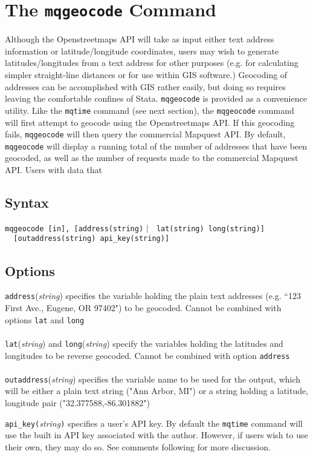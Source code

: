 \documentclass[12pt]{article}
\begin{document}
\section{The \texttt{mqgeocode} Command}
Although the Openstreetmaps API will take as input either text address information or latitude/longitude coordinates, users may wish to generate latitudes/longitudes from a text address for other purposes (e.g. for calculating simpler straight-line distances or for use within GIS software.) Geocoding of addresses can be accomplished with GIS rather easily, but doing so requires leaving the comfortable confines of Stata. \verb|mqgeocode| is provided as a convenience utility. Like the \verb|mqtime| command (see next section), the \verb|mqgeocode| command will first attempt to geocode using the Openstreetmaps API. If this geocoding fails, \verb|mqgeocode| will then query the commercial Mapquest API. By default,  \verb|mqgeocode| will display a running total of the number of addresses that have been geocoded, as well as the number of requests made to the commercial Mapquest API. Users with data that 

\subsection{Syntax}
\verb|mqgeocode [in], [address(string)| $\arrowvert$ \verb| lat(string) long(string)]|\\ \verb|  [outaddress(string) api_key(string)]|


\subsection{Options}
\verb|address|(\textit{string}) specifies the variable holding the plain text addresses (e.g. ``123 First Ave., Eugene, OR 97402") to be geocoded. Cannot be combined with options \verb|lat| and \verb|long|
\\ \\
\verb|lat|(\textit{string}) and \verb|long|(\textit{string}) specify the variables holding the latitudes and longitudes to be reverse geocoded. Cannot be combined with option \verb|address|
\\ \\
\verb|outaddress|(\textit{string}) specifies the variable name to be used for the output, which will be either a plain text string ("Ann Arbor, MI") or a string holding a latitude, longitude pair ("32.377588,-86.301882")

\verb|api_key(|\textit{string}\verb|)| specifies a user's API key. By default the \verb|mqtime| command will use the built in API key associated with the author. However, if users wish to use their own, they may do so. See comments following for more discussion.
\end{document}
